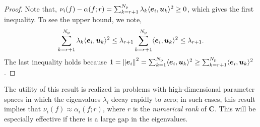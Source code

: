 \documentclass[11pt]{article}
\renewcommand{\vec}[1]{{\mathchoice
                     {\mbox{\boldmath$\displaystyle{#1}$}}
                     {\mbox{\boldmath$\textstyle{#1}$}}
                     {\mbox{\boldmath$\scriptstyle{#1}$}}
                     {\mbox{\boldmath$\scriptscriptstyle{#1}$}}}}
\newcommand{\norm}[1]{\left\| {#1} \right\|}
\newcommand{\R}{\mathbb{R}}
\newcommand{\ip}[2]{\langle{#1}, {#2}\rangle}
\newcommand{\mat}[1]{\mathbf{{#1}}}
\newcommand{\Np}{{N_\text{p}}}
\begin{document}
\begin{proof} 


Note that, $\nu_i(f) - \alpha(f; r)  = \sum_{k=r+1}^\Np \lambda_k \ip{\vec{e}_i}{\vec{u}_k}^2 \geq 0$,
which gives the first inequality. To see the upper bound, we note,
\[
   \sum_{k=r+1}^\Np \lambda_k \ip{\vec{e}_i}{\vec{u}_k}^2 \leq \lambda_{r+1} \sum_{k=r+1}^\Np \ip{\vec{e}_i}{\vec{u}_k}^2
   \leq \lambda_{r+1}. 
\]
The last inequality holds because 
$1 = \norm{\vec{e}_i}^2 = 
\sum_{k = 1}^\Np \ip{\vec{e}_i}{\vec{u}_k}^2 
\geq \sum_{k=r+1}^\Np \ip{\vec{e}_i}{\vec{u}_k}^2$.
\end{proof} 
The utility of this result is realized in problems with 
high-dimensional parameter spaces in which 
the eigenvalues $\lambda_i$ decay rapidly to zero; in 
such cases, this result implies that  $\nu_i(f) \approx \alpha_i(f; r)$,
where $r$ is the \emph{numerical rank} of $\mat{C}$.  This will be especially
effective if there is a large gap in the eigenvalues.  
\end{document}
